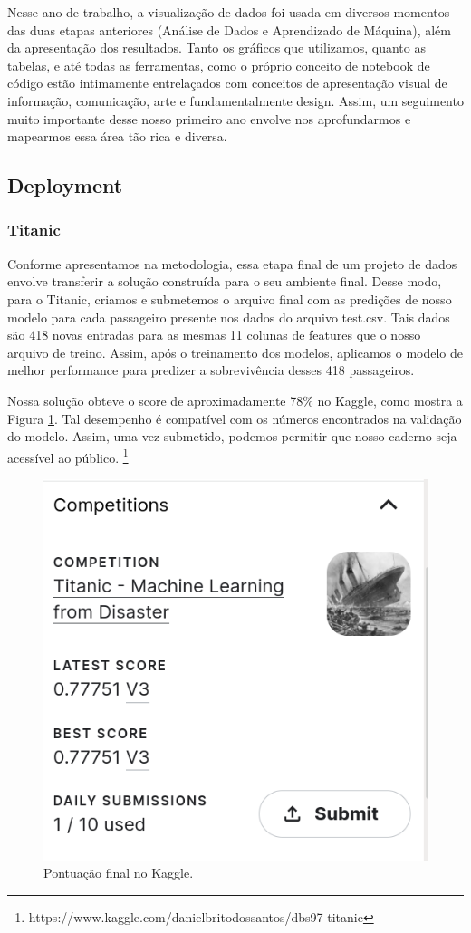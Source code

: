 Nesse ano de trabalho, a visualização de dados foi usada em diversos momentos das duas etapas anteriores (Análise de Dados e Aprendizado de Máquina), além da apresentação dos resultados. Tanto os gráficos que utilizamos, quanto as tabelas, e até todas as ferramentas, como o próprio conceito de notebook de código estão intimamente entrelaçados com conceitos de apresentação visual de informação, comunicação, arte e fundamentalmente design. 
Assim, um seguimento muito importante desse nosso primeiro ano envolve nos aprofundarmos e mapearmos essa área tão rica e diversa. 

\subsection{Deployment}
\subsubsection{Titanic}
Conforme apresentamos na metodologia, essa etapa final de um projeto de dados envolve transferir a solução construída para o seu ambiente final. Desse modo, para o Titanic, criamos e submetemos o arquivo final com as predições de nosso modelo para cada passageiro presente nos dados do arquivo test.csv. Tais dados são 418 novas entradas para as mesmas 11 colunas de features que o nosso arquivo de treino. Assim, após o treinamento dos modelos, aplicamos o modelo de melhor performance para predizer a sobrevivência desses 418 passageiros. 

Nossa solução obteve o score de aproximadamente 78\% no Kaggle, como mostra a Figura \ref{kaggle.score}. Tal desempenho é compatível com os números encontrados na validação do modelo. Assim, uma vez submetido, podemos permitir que nosso caderno seja acessível ao público. \footnote{https://www.kaggle.com/danielbritodossantos/dbs97-titanic}

\begin{figure}[H]
 \centering
 \includegraphics[width=\textwidth]{Figures/Score.png}
 \caption{\label{kaggle.score}Pontuação final no Kaggle.}
\end{figure}
